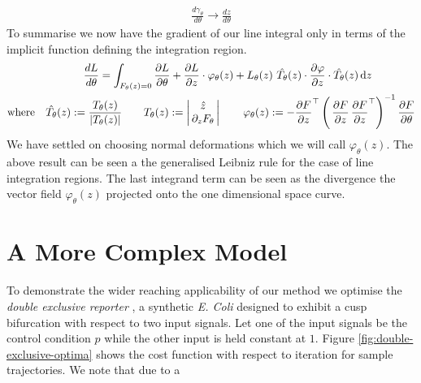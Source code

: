 \begin{align}
    \frac{d \gamma_{\theta}}{d\theta} \rightarrow \frac{d z}{d\theta}
\end{align}
To summarise we now have the gradient of our line integral only in terms of the implicit function defining the integration region.
\begin{align}
    \frac{d L}{d\theta} =\int_{F_{\theta}(z)=0}
        \frac{\partial L}{\partial\theta}+
        \frac{\partial L}{\partial z}\cdot
        \varphi_{\theta}(z)
    +L_{\theta}(z)\,\,
    \hat{T_{\theta}}(z)\cdot\frac{\partial \varphi}{\partial z}\cdot\hat{T_{\theta}}(z)
    \,\mathrm{d}z\qquad\qquad\\
    \mathrm{where}\quad
    \hat{T_{\theta}}(z):= \frac{T_{\theta}(z)}{|T_{\theta}(z)|}
    \qquad
    T_{\theta}(z):=
    \left|\begin{matrix}
        \hat{z} \\
        \,\partial_{z}F_{\theta}\,
    \end{matrix}\right|
    \qquad
    \varphi_{\theta}(z) :=
- \frac{\partial F}{\partial z}^\top
    \left(\,
        \frac{\partial F}{\partial z}\,\frac{\partial F}{\partial z}^\top
    \right)^{-1}
    \frac{\partial F}{\partial\theta}
\end{align}
We have settled on choosing normal deformations which we will call $\varphi_\theta(z)$. The above result can be seen a the generalised Leibniz rule \cite{Flanders1973DifferentiationSign} for the case of line integration regions. The last integrand term can be seen as the divergence the vector field $\varphi_\theta(z)$ projected onto the one dimensional space curve.

\section{A More Complex Model}
\label{appendix:double-exclusive}
To demonstrate the wider reaching applicability of our method we optimise the \emph{double exclusive reporter} \cite{Grant2020InterpretationCircuit}, a synthetic \emph{E. Coli} designed to exhibit a cusp bifurcation with respect to two input signals. Let one of the input signals be the control condition $p$ while the other input is held constant at $1$. Figure \ref{fig:double-exclusive-optima} shows the cost function with respect to iteration for sample trajectories. We note that due to a


